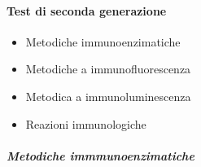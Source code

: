 \documentclass[italian,]{article}
\providecommand{\tightlist}{%
  \setlength{\itemsep}{0pt}\setlength{\parskip}{0pt}}
\begin{document}
\hypertarget{test-di-seconda-generazione}{%
\paragraph{Test di seconda
generazione}\label{test-di-seconda-generazione}}

\begin{itemize}
\tightlist
\item
  Metodiche immunoenzimatiche
\item
  Metodiche a immunofluorescenza
\item
  Metodica a immunoluminescenza
\item
  Reazioni immunologiche
\end{itemize}

\hypertarget{metodiche-immmunoenzimatiche}{%
\subparagraph{Metodiche
immmunoenzimatiche}\label{metodiche-immmunoenzimatiche}}
\end{document}
